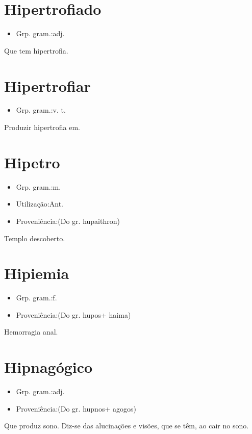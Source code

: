 \documentclass{article}
\begin{document}
\section{Hipertrofiado}
\begin{itemize}
\item {Grp. gram.:adj.}
\end{itemize}
Que tem hipertrofia.
\section{Hipertrofiar}
\begin{itemize}
\item {Grp. gram.:v. t.}
\end{itemize}
Produzir hipertrofia em.
\section{Hipetro}
\begin{itemize}
\item {Grp. gram.:m.}
\end{itemize}
\begin{itemize}
\item {Utilização:Ant.}
\end{itemize}
\begin{itemize}
\item {Proveniência:(Do gr. \textunderscore hupaithron\textunderscore )}
\end{itemize}
Templo descoberto.
\section{Hipiemia}
\begin{itemize}
\item {Grp. gram.:f.}
\end{itemize}
\begin{itemize}
\item {Proveniência:(Do gr. \textunderscore hupos\textunderscore  + \textunderscore haima\textunderscore )}
\end{itemize}
Hemorragia anal.
\section{Hipnagógico}
\begin{itemize}
\item {Grp. gram.:adj.}
\end{itemize}
\begin{itemize}
\item {Proveniência:(Do gr. \textunderscore hupnos\textunderscore  + \textunderscore agogos\textunderscore )}
\end{itemize}
Que produz sono.
Diz-se das alucinações e visões, que se têm, ao cair no sono.
\end{document}
